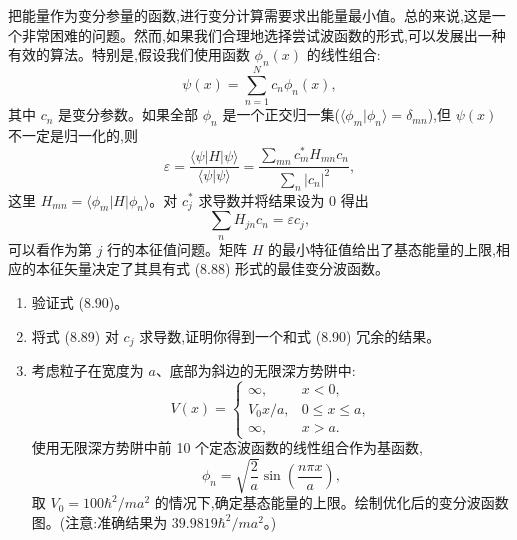 \begin{question}
把能量作为变分参量的函数,进行变分计算需要求出能量最小值。总的来说,这是一个非常困难的问题。然而,如果我们合理地选择尝试波函数的形式,可以发展出一种有效的算法。特别是,假设我们使用函数 $\phi_n(x)$ 的线性组合:
\[
\psi(x)=\sum_{n=1}^N c_n\phi_n(x),
\]
其中 $c_n$ 是变分参数。如果全部 $\phi_n$ 是一个正交归一集($\langle\phi_m|\phi_n\rangle=\delta_{mn}$),但 $\psi(x)$ 不一定是归一化的,则
\[
\varepsilon=\frac{\langle\psi|H|\psi\rangle}{\langle\psi|\psi\rangle}=
\frac{\sum_{mn}c_m^*H_{mn}c_n}{\sum_n |c_n|^2},
\]
这里 $H_{mn}=\langle\phi_m|H|\phi_n\rangle$。对 $c_j^*$ 求导数并将结果设为 0 得出
\[
\sum_n H_{jn}c_n=\varepsilon c_j,
\]
可以看作为第 $j$ 行的本征值问题。矩阵 $H$ 的最小特征值给出了基态能量的上限,相应的本征矢量决定了其具有式 (8.88) 形式的最佳变分波函数。
\begin{enumerate}
\item 验证式 (8.90)。
\item 将式 (8.89) 对 $c_j$ 求导数,证明你得到一个和式 (8.90) 冗余的结果。
\item 考虑粒子在宽度为 $a$、底部为斜边的无限深方势阱中:
\[
V(x)=\begin{cases}
\infty, & x<0,\\
V_0x/a, & 0\le x\le a,\\
\infty, & x>a.
\end{cases}
\]
使用无限深方势阱中前 10 个定态波函数的线性组合作为基函数,
\[
\phi_n=\sqrt{\frac2a}\sin\left(\frac{n\pi x}{a}\right),
\]
取 $V_0=100\hbar^2/ma^2$ 的情况下,确定基态能量的上限。绘制优化后的变分波函数图。(注意:准确结果为 $39.9819\hbar^2/ma^2$。)
\end{enumerate}

\par\smallskip
{}

\end{question}

